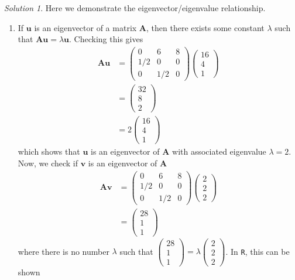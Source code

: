 \documentclass[
]{book}
\providecommand{\tightlist}{%
  \setlength{\itemsep}{0pt}\setlength{\parskip}{0pt}}
\theoremstyle{definition}
\theoremstyle{definition}
\theoremstyle{definition}
\theoremstyle{definition}
\theoremstyle{remark}
\newtheorem*{solution}{Solution}
\begin{document}
\begin{solution}

Here we demonstrate the eigenvector/eigenvalue relationship.

\begin{enumerate}
\def\labelenumi{\alph{enumi})}
\tightlist
\item
  If \(\mathbf{u}\) is an eigenvector of a matrix \(\mathbf{A}\), then there exists some constant \(\lambda\) such that \(\mathbf{A} \mathbf{u} = \lambda \mathbf{u}\). Checking this gives
  \[
  \begin{aligned}
  \mathbf{A} \mathbf{u} & = \begin{pmatrix} 0 & 6 & 8 \\ 1/2 & 0 & 0 \\ 0 & 1/2 & 0 \end{pmatrix} \begin{pmatrix} 16 \\ 4 \\ 1 \end{pmatrix} \\
  & = \begin{pmatrix} 32 \\ 8 \\ 2 \end{pmatrix} \\ 
  & = 2 \begin{pmatrix} 16 \\ 4 \\ 1 \end{pmatrix}
  \end{aligned}
  \]
  which shows that \(\mathbf{u}\) is an eigenvector of \(\mathbf{A}\) with associated eigenvalue \(\lambda = 2\). Now, we check if \(\mathbf{v}\) is an eigenvector of \(\mathbf{A}\)
  \[
  \begin{aligned}
  \mathbf{A} \mathbf{v} & = \begin{pmatrix} 0 & 6 & 8 \\ 1/2 & 0 & 0 \\ 0 & 1/2 & 0 \end{pmatrix} \begin{pmatrix} 2 \\ 2 \\ 2 \end{pmatrix} \\
  & = \begin{pmatrix} 28 \\ 1 \\ 1 \end{pmatrix} 
  \end{aligned}
  \]
  where there is no number \(\lambda\) such that \(\begin{pmatrix} 28 \\ 1 \\ 1 \end{pmatrix} = \lambda \begin{pmatrix} 2 \\ 2 \\ 2 \end{pmatrix}\). In \texttt{R}, this can be shown
\end{enumerate}


\end{solution}
\end{document}
